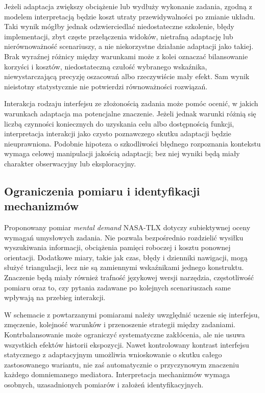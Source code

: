 \documentclass[11pt,a4paper]{article}
\begin{document}
Jeżeli adaptacja zwiększy obciążenie lub wydłuży wykonanie zadania, zgodną z modelem interpretacją będzie koszt utraty przewidywalności po zmianie układu. Taki wynik mógłby jednak odzwierciedlać niedostateczne szkolenie, błędy implementacji, zbyt częste przełączenia widoków, nietrafną adaptację lub nierównoważność scenariuszy, a nie niekorzystne działanie adaptacji jako takiej. Brak wyraźnej różnicy między warunkami może z kolei oznaczać bilansowanie korzyści i kosztów, niedostateczną czułość wybranego wskaźnika, niewystarczającą precyzję oszacowań albo rzeczywiście mały efekt. Sam wynik nieistotny statystycznie nie potwierdzi równoważności rozwiązań.

Interakcja rodzaju interfejsu ze złożonością zadania może pomóc ocenić, w jakich warunkach adaptacja ma potencjalne znaczenie. Jeżeli jednak warunki różnią się liczbą czynności koniecznych do uzyskania celu albo dostępnością funkcji, interpretacja interakcji jako czysto poznawczego skutku adaptacji będzie nieuprawniona. Podobnie hipoteza o szkodliwości błędnego rozpoznania kontekstu wymaga celowej manipulacji jakością adaptacji; bez niej wyniki będą miały charakter obserwacyjny lub eksploracyjny.

\subsection{Ograniczenia pomiaru i identyfikacji mechanizmów}

Proponowany pomiar \textit{mental demand} NASA-TLX dotyczy subiektywnej oceny wymagań umysłowych zadania. Nie pozwala bezpośrednio rozdzielić wysiłku wyszukiwania informacji, obciążenia pamięci roboczej i kosztu ponownej orientacji. Dodatkowe miary, takie jak czas, błędy i dzienniki nawigacji, mogą służyć triangulacji, lecz nie są zamiennymi wskaźnikami jednego konstruktu. Znaczenie będą miały również trafność językowej wersji narzędzia, częstotliwość pomiaru oraz to, czy pytania zadawane po kolejnych scenariuszach same wpływają na przebieg interakcji.

W schemacie z powtarzanymi pomiarami należy uwzględnić uczenie się interfejsu, zmęczenie, kolejność warunków i przenoszenie strategii między zadaniami. Kontrbalansowanie może ograniczyć systematyczne zakłócenia, ale nie usuwa wszystkich efektów historii ekspozycji. Nawet kontrolowany kontrast interfejsu statycznego z adaptacyjnym umożliwia wnioskowanie o skutku całego zastosowanego wariantu, nie zaś automatycznie o przyczynowym znaczeniu każdego domniemanego mediatora. Interpretacja mechanizmów wymaga osobnych, uzasadnionych pomiarów i założeń identyfikacyjnych.
\end{document}
